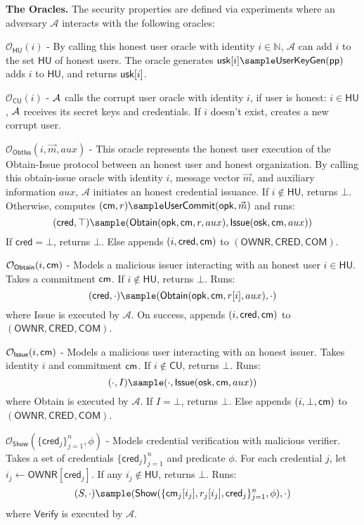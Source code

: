 \noindent \textbf{The Oracles.} The security properties are defined via experiments where an adversary $\mathcal{A}$ interacts with the following oracles:

\noindent $\mathcal{O}_{\mathsf{HU}}(i)$ - By calling this honest user oracle with identity $i \in \mathbb{N}$, $\mathcal{A}$ can add $i$ to the set $\mathsf{HU}$ of honest users. The oracle generates $\usk[i] \sample \mathsf{UserKeyGen}(\ppar)$ adds $i$ to $\mathsf{HU}$, and returns $\mathsf{usk}[i]$.

\noindent $\mathcal{O}_{\mathsf{CU}}(i)$ - $\mathcal{A}$ calls the corrupt user oracle with identity $i$, if user is honest: $i \in \mathsf{HU}$, $\mathcal{A}$ receives its secret keys and credentials. If $i$ doesn't exist, creates a new corrupt user.

\noindent $\mathcal{O}_{\mathsf{ObtIss}}(i, \vec{m}, aux)$ - This oracle represents the honest user execution of the Obtain-Issue protocol between an honest user and honest organization. By calling this obtain-issue oracle with identity $i$, message vector $\vec{m}$, and auxiliary information $aux$, $\mathcal{A}$ initiates an honest credential issuance. If $i \notin \mathsf{HU}$, returns $\bot$. Otherwise, computes $(\cm, r) \sample \mathsf{UserCommit}(\opk, \vec{m})$ and runs:
\[
(\mathsf{cred}, \top) \sample (\mathsf{Obtain}(\opk, \cm, r, aux), \mathsf{Issue}(\osk, \cm, aux))
\]
If $\mathsf{cred} = \bot$, returns $\bot$. Else appends $(i, \mathsf{cred}, \mathsf{cm})$ to $(\mathsf{OWNR}, \mathsf{CRED}, \mathsf{COM})$.



\noindent $\mathcal{O}_{\mathsf{Obtain}}(i, \mathsf{cm})$ - Models a malicious issuer interacting with an honest user $i \in \mathsf{HU}$. Takes a commitment $\mathsf{cm}$. If $i \notin \mathsf{HU}$, returns $\bot$. Runs:
\[
(\mathsf{cred}, \cdot) \sample (\mathsf{Obtain}(\opk, \cm, r[i], aux), \cdot)
\]
where Issue is executed by $\mathcal{A}$. On success, appends $(i, \mathsf{cred}, \mathsf{cm})$ to $(\mathsf{OWNR}, \mathsf{CRED}, \mathsf{COM})$.




\noindent $\mathcal{O}_{\mathsf{Issue}}(i, \mathsf{cm})$ - Models a malicious user interacting with an honest issuer. Takes identity $i$ and commitment $\mathsf{cm}$. If $i \notin \mathsf{CU}$, returns $\bot$. Runs:
\[
(\cdot, I) \sample (\cdot, \mathsf{Issue}(\osk, \cm, aux))
\]
where Obtain is executed by $\mathcal{A}$. If $I = \bot$, returns $\bot$. Else appends $(i, \bot, \mathsf{cm})$ to $(\mathsf{OWNR}, \mathsf{CRED}, \mathsf{COM})$.


\noindent $\mathcal{O}_{\mathsf{Show}}(\{\mathsf{cred}_j\}_{j=1}^n, \phi)$ - Models credential verification with malicious verifier. Takes a set of credentials $\{\mathsf{cred}_j\}_{j=1}^n$ and predicate $\phi$. For each credential $j$, let $i_j \gets \mathsf{OWNR}[\mathsf{cred}_j]$. If any $i_j \notin \mathsf{HU}$, returns $\bot$. Runs:
\[
(S, \cdot) \sample (\mathsf{Show}(\{\cm_j[i_j], r_j[i_j], \mathsf{cred}_j\}_{j=1}^n, \phi), \cdot)
\]
where $\mathsf{Verify}$ is executed by $\mathcal{A}$.



